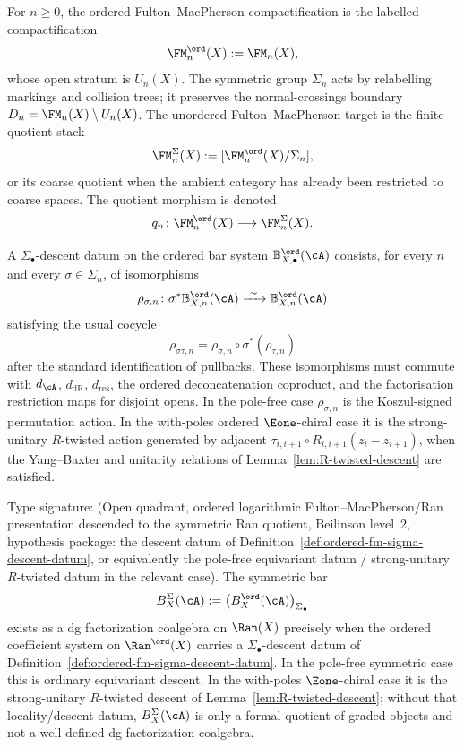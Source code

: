\begin{definition}
\label{def:ordered-fm-sigma-descent-datum}
For \(n\ge0\), the ordered Fulton--MacPherson compactification is the
labelled compactification
\[
\FM^{\ord}_n(X):=\FM_n(X),
\]
whose open stratum is \(U_n(X)\). The symmetric group \(\Sigma_n\)
acts by relabelling markings and collision trees; it preserves the
normal-crossings boundary \(D_n=\FM_n(X)\setminus U_n(X)\). The
unordered Fulton--MacPherson target is the finite quotient stack
\[
\FM^\Sigma_n(X):=[\FM^{\ord}_n(X)/\Sigma_n],
\]
or its coarse quotient when the ambient category has already been
restricted to coarse spaces. The quotient morphism is denoted
\[
q_n\colon \FM^{\ord}_n(X)\longrightarrow \FM^\Sigma_n(X).
\]

A \(\Sigma_\bullet\)-descent datum on the ordered bar system
\(\mathbb B^{\ord}_{X,\bullet}(\cA)\) consists, for every \(n\) and
every \(\sigma\in\Sigma_n\), of isomorphisms
\[
\rho_{\sigma,n}\colon
\sigma^*\mathbb B^{\ord}_{X,n}(\cA)
\xrightarrow{\ \sim\ }
\mathbb B^{\ord}_{X,n}(\cA)
\]
satisfying the usual cocycle
\[
\rho_{\sigma\tau,n}
=\rho_{\sigma,n}\circ\sigma^*(\rho_{\tau,n})
\]
after the standard identification of pullbacks. These isomorphisms
must commute with \(d_\cA\), \(d_{\mathrm{dR}}\),
\(d_{\mathrm{res}}\), the ordered deconcatenation coproduct, and the
factorisation restriction maps for disjoint opens. In the pole-free
case \(\rho_{\sigma,n}\) is the Koszul-signed permutation action. In
the with-poles ordered \(\Eone\)-chiral case it is the
strong-unitary \(R\)-twisted action generated by adjacent
\(\tau_{i,i+1}\circ R_{i,i+1}(z_i-z_{i+1})\), when the
Yang--Baxter and unitarity relations of
Lemma~\ref{lem:R-twisted-descent} are satisfied.
\end{definition}

\begin{proposition}
\label{prop:symmetric-bar-descent-criterion}
Type signature: \textup{(}Open quadrant, ordered logarithmic
Fulton--MacPherson/Ran presentation descended to the symmetric Ran
quotient, Beilinson level~$2$, hypothesis package: the descent datum of
Definition~\ref{def:ordered-fm-sigma-descent-datum}, or equivalently
the pole-free equivariant datum / strong-unitary \(R\)-twisted datum in
the relevant case\textup{)}.
The symmetric bar
\[
B^\Sigma_X(\cA):=\bigl(B_X^{\ord}(\cA)\bigr)_{\Sigma_\bullet}
\]
exists as a dg factorization coalgebra on $\Ran(X)$ precisely when the
ordered coefficient system on $\Ran^{\ord}(X)$ carries a
\(\Sigma_\bullet\)-descent datum of
Definition~\ref{def:ordered-fm-sigma-descent-datum}. In the pole-free
symmetric case this is ordinary equivariant descent. In the with-poles
$\Eone$-chiral case it is the strong-unitary
$R$-twisted descent of Lemma~\ref{lem:R-twisted-descent}; without that
locality/descent datum, $B^\Sigma_X(\cA)$ is only a formal quotient of
graded objects and not a well-defined dg factorization coalgebra.
\end{proposition}

